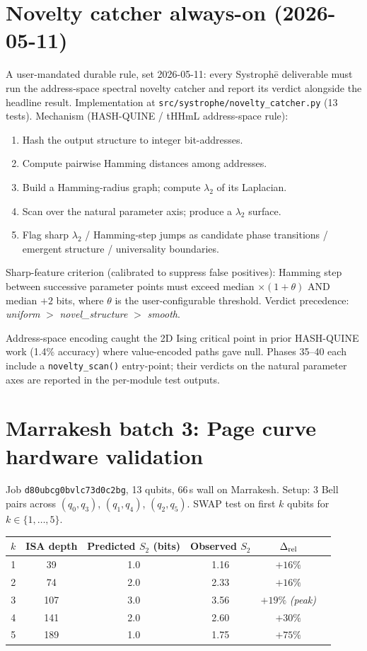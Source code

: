 \documentclass[11pt,a4paper]{article}
\begin{document}
\section{Novelty catcher always-on (2026-05-11)}

A user-mandated durable rule, set 2026-05-11: every Systroph\=e
deliverable must run the address-space spectral novelty catcher
and report its verdict alongside the headline result. Implementation
at \texttt{src/systrophe/novelty\_catcher.py} (13 tests). Mechanism
(HASH-QUINE / tHHmL address-space rule):
\begin{enumerate}
\item Hash the output structure to integer bit-addresses.
\item Compute pairwise Hamming distances among addresses.
\item Build a Hamming-radius graph; compute $\lambda_2$ of its
  Laplacian.
\item Scan over the natural parameter axis; produce a $\lambda_2$
  surface.
\item Flag sharp $\lambda_2$ / Hamming-step jumps as candidate phase
  transitions / emergent structure / universality boundaries.
\end{enumerate}

Sharp-feature criterion (calibrated to suppress false positives):
Hamming step between successive parameter points must exceed median
$\times (1 + \theta)$ AND median $+ 2$ bits, where $\theta$ is the
user-configurable threshold. Verdict precedence:
\textit{uniform} $>$ \textit{novel\_structure} $>$ \textit{smooth}.

Address-space encoding caught the 2D Ising critical point in prior
HASH-QUINE work (1.4\% accuracy) where value-encoded paths gave null.
Phases 35--40 each include a \texttt{novelty\_scan()} entry-point;
their verdicts on the natural parameter axes are reported in the
per-module test outputs.

\section{Marrakesh batch 3: Page curve hardware validation}

Job \texttt{d80ubcg0bvlc73d0c2bg}, 13 qubits, 66\,s wall on Marrakesh.
Setup: 3 Bell pairs across $(q_0, q_3)$, $(q_1, q_4)$, $(q_2, q_5)$.
SWAP test on first $k$ qubits for $k \in \{1, \dots, 5\}$.

\begin{tabular}{cccccc}
\toprule
$k$ & ISA depth & Predicted $S_2$ (bits) & Observed $S_2$ & $\Delta_{\rm rel}$ \\
\midrule
1 & 39 & 1.0 & 1.16 & $+16\%$ \\
2 & 74 & 2.0 & 2.33 & $+16\%$ \\
3 & 107 & 3.0 & 3.56 & $+19\%$ \emph{(peak)}\\
4 & 141 & 2.0 & 2.60 & $+30\%$ \\
5 & 189 & 1.0 & 1.75 & $+75\%$ \\
\bottomrule
\end{tabular}
\end{document}

